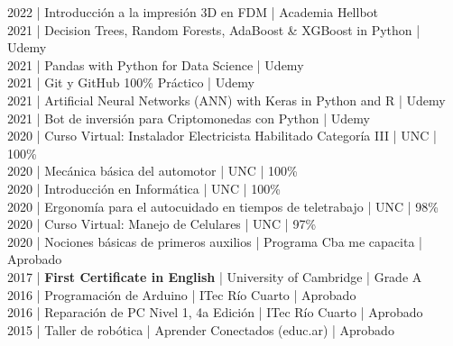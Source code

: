 {2022 | Introducción a la impresión 3D en FDM | Academia Hellbot \\
2021 | Decision Trees, Random Forests, AdaBoost \& XGBoost in Python | Udemy \\
2021 | Pandas with Python for Data Science | Udemy \\
2021 | Git y GitHub 100\% Práctico | Udemy \\
2021 | Artificial Neural Networks (ANN) with Keras in Python and R | Udemy \\
2021 | Bot de inversión para Criptomonedas con Python | Udemy \\
2020 | Curso Virtual: Instalador Electricista Habilitado Categoría III | UNC | 100\% \\
2020 | Mecánica básica del automotor | UNC | 100\% \\
2020 | Introducción en Informática | UNC | 100\% \\
2020 | Ergonomía para el autocuidado en tiempos de teletrabajo | UNC | 98\% \\
2020 | Curso Virtual: Manejo de Celulares | UNC | 97\% \\
2020 | Nociones básicas de primeros auxilios | Programa Cba me capacita | Aprobado \\
2017 | \textbf{First Certificate in English} | University of Cambridge | Grade A \\
2016 | Programación de Arduino | ITec Río Cuarto | Aprobado \\
2016 | Reparación de PC Nivel 1, 4a Edición | ITec Río Cuarto | Aprobado \\
2015 | Taller de robótica | Aprender Conectados (educ.ar) | Aprobado \\
}
